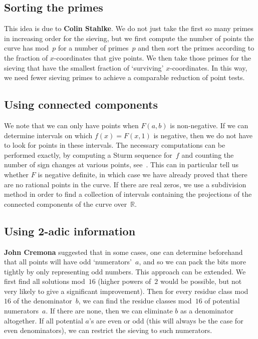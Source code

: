 \documentclass[12pt,a4paper,oneside]{amsart}
\newcommand{\R}{{\mathbb R}}
\begin{document}
\subsection{Sorting the primes}

This idea is due to \textbf{Colin Stahlke}. We do not just take the first so many
primes in increasing order for the sieving, but we first compute the
number of points the curve has mod~$p$ for a number of primes~$p$ and then
sort the primes according to the fraction of $x$-coordinates that give points.
We then take those primes for the sieving that have the smallest fraction
of `surviving' $x$-coordinates. In this way, we need fewer sieving primes
to achieve a comparable reduction of point tests.

\subsection{Using connected components}

We note that we can only have points when $F(a, b)$ is non-negative.
If we can determine intervals on which $f(x) = F(x, 1)$ is negative, then
we do not have to look for points in these intervals. The necessary
computations can be performed exactly, by computing a Sturm sequence
for~$f$ and counting the number of sign changes at various points,
see~\cite[Thm.~4.1.10]{Cohen}. This can in particular tell us whether
$F$ is negative definite, in which case we have already proved that there
are no rational points in the curve. If there are real zeros, we use
a subdivision method in order to find a collection of intervals containing
the projections of the connected components of the curve over~$\R$.

\subsection{Using 2-adic information}

\textbf{John Cremona} suggested that in some cases, one can determine beforehand
that all points will have odd `numerators'~$a$, and so we can pack the
bits more tightly by only representing odd numbers. This approach can be
extended. We first find all solutions mod~$16$ (higher powers of~$2$ would
be possible, but not very likely to give a significant improvement). Then for every
residue class mod~$16$ of the denominator~$b$, we can find the residue
classes mod~$16$ of potential numerators~$a$. If there are none, then we
can eliminate $b$ as a denominator altogether. If all potential $a$'s are
even or odd (this will always be the case for even denominators), we can
restrict the sieving to such numerators.
\end{document}
